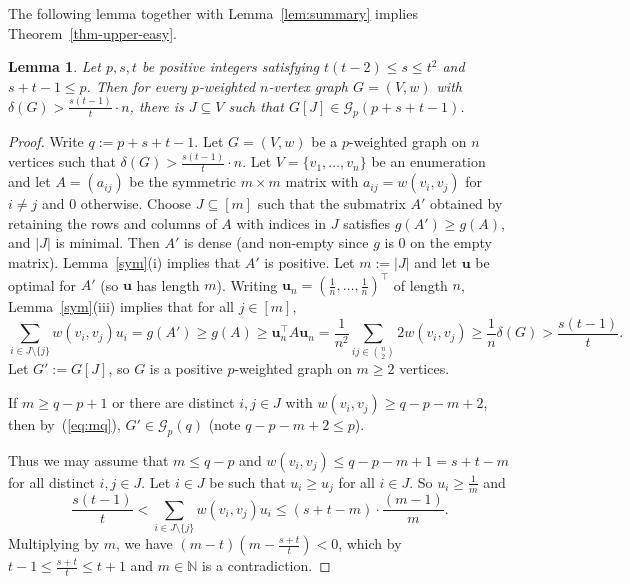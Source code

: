 \documentclass[10pt,a4paper]{article}
\newtheorem{lemma}[theorem]{Lemma}
\theoremstyle{definition}
\newcommand{\cG}{\mathcal{G}}
\begin{document}
The following lemma together with Lemma~\ref{lem:summary} implies Theorem~\ref{thm-upper-easy}.


\begin{lemma}\label{uppertilde}
	Let $p,s,t$ be positive integers satisfying $t(t-2) \leq s \leq t^2$ and $s+t-1 \leq p$. Then
	for every $p$-weighted $n$-vertex graph $G=(V,w)$ with $\delta(G) > \frac{s(t-1)}{t}\cdot n$,
	there is $J \subseteq V$ such that $G[J] \in \cG_p(p+s+t-1)$.
\end{lemma}

\begin{proof}
	Write $q := p+s+t-1$.
	Let $G=(V,w)$ be a $p$-weighted graph on $n$ vertices such that $\delta(G) > \frac{s(t-1)}{t} \cdot n$. 
	Let $V=\{v_1,\ldots,v_n\}$ be an enumeration and let $A = (a_{ij})$ be the symmetric $m \times m$ matrix with $a_{ij}=w(v_i,v_j)$ for $i \neq j$ and $0$ otherwise.
	Choose $J \subseteq [m]$ such that the submatrix $A'$ obtained by retaining the rows and columns of $A$ with indices in $J$ satisfies $g(A') \geq g(A)$, and $|J|$ is minimal.
	Then $A'$ is dense (and non-empty since $g$ is $0$ on the empty matrix).
	Lemma~\ref{sym}(i) implies that $A'$ is positive.
	Let $m := |J|$
	and let $\bm{u}$ be optimal for $A'$ (so $\bm{u}$ has length $m$).
	Writing $\bm{u}_n=(\frac{1}{n},\ldots,\frac{1}{n})^\intercal$ of length $n$, Lemma~\ref{sym}(iii) implies that for all $j\in[m]$,
	$$
	\sum_{i \in J\setminus\{j\}}w(v_i,v_j)u_i = g(A') \geq g(A) \geq \bm{u}_n^\intercal A \bm{u}_n = \frac{1}{n^2}\sum_{ij \in \binom{n}{2}}2w(v_i,v_j) \geq \frac{1}{n}\delta(G) > \frac{s(t-1)}{t}.
	$$
	Let $G' := G[J]$, so $G$ is a positive $p$-weighted graph on $m\ge 2$ vertices.
	
	If $m \geq q-p+1$ or there are distinct $i,j \in J$ with $w(v_i,v_j) \geq q-p-m+2$, then by~(\ref{eq:mq}), $G' \in \mathcal{G}_p(q)$ (note $q-p-m+2 \leq p$).
	
	Thus we may assume that $m \leq q-p$ and $w(v_i,v_j) \leq q-p-m+1=s+t-m$ for all distinct $i,j \in J$.
	Let $i \in J$ be such that $u_i \geq u_j$ for all $i \in J$. So $u_i \geq \frac{1}{m}$ and
	\begin{equation}\label{eq:cont}
		\frac{s(t-1)}{t} < \sum_{i \in J\setminus\{j\}}w(v_i,v_j)u_i  \leq (s+t-m)\cdot \frac{(m-1)}{m}.
	\end{equation}
Multiplying by $m$, we have $(m-t)(m-\frac{s+t}{t}) < 0$, which by $t-1 \leq \frac{s+t}{t} \leq t+1$ and $m \in \mathbb{N}$ is a contradiction.
\end{proof}
\end{document}
